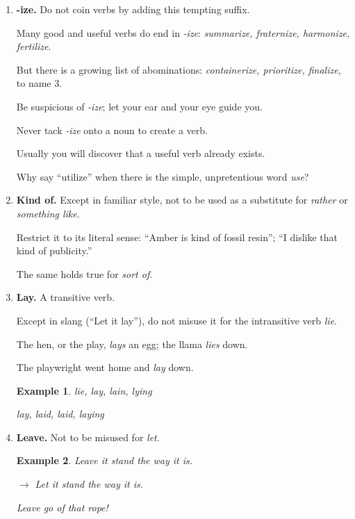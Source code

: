 \documentclass{book}
\numberwithin{equation}{section}
\newtheorem{example}{Example}[chapter]
\begin{document}
\begin{enumerate}
    The error results from failure to see the negative in \textit{-less} and from a desire to get it in as a prefix, suggested by such words as \textit{irregular, irresponsible}, and, perhaps especially, \textit{irrespective}.
    \item \textbf{-ize.} Do not coin verbs by adding this tempting suffix.
    
    Many good and useful verbs do end in \textit{-ize}: \textit{summarize, fraternize, harmonize, fertilize}.
    
    But there is a growing list of abominations: \textit{containerize, prioritize, finalize}, to name 3.
    
    Be suspicious of \textit{-ize}; let your ear and your eye guide you.
    
    Never tack \textit{-ize} onto a noun to create a verb.
    
    Usually you will discover that a useful verb already exists.
    
    Why say ``utilize'' when there is the simple, unpretentious word \textit{use}?
    \item \textbf{Kind of.} Except in familiar style, not to be used as a substitute for \textit{rather} or \textit{something like}.
    
    Restrict it to its literal sense: ``Amber is kind of fossil resin''; ``I dislike that kind of publicity.''
    
    The same holds true for \textit{sort of}.
    \item \textbf{Lay.} A transitive verb.
    
    Except in slang (``Let it lay''), do not misuse it for the intransitive verb \textit{lie}.
    
    The hen, or the play, \textit{lays} an egg; the llama \textit{lies} down.
    
    The playwright went home and \textit{lay} down.
    \begin{example}
        lie, lay, lain, lying
        
        lay, laid, laid, laying
    \end{example}
    \item \textbf{Leave.} Not to be misused for \textit{let}.
    \begin{example}
        Leave it stand the way it is.
        
        $\to$ Let it stand the way it is.
        
        Leave go of that rope!
        

\end{example}
\end{enumerate}
\end{document}
